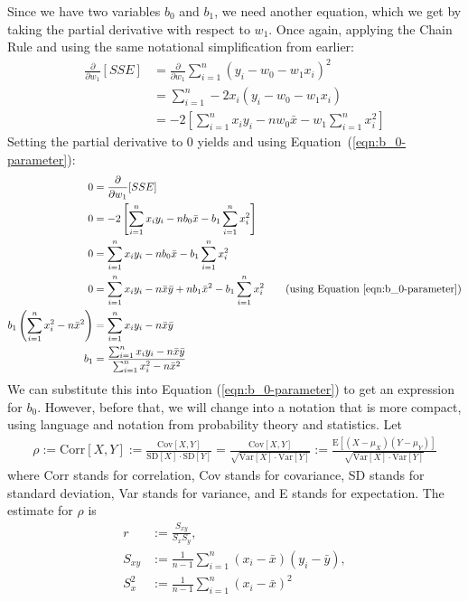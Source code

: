 \documentclass[12pt, a4paper]{article}
\theoremstyle{definition}
\begin{document}
	Since we have two variables $b_0$ and $b_1$, we need another equation, which we get by
	taking the partial derivative with respect to $w_1$. Once again, applying the Chain Rule and
	using the same notational simplification from earlier:
	\begin{align*}
		\frac{\partial}{\partial w_1}[SSE]
		&=\frac{\partial}{\partial w_1}\sum_{i=1}^{n}(y_i-w_0-w_1x_i)^2\\
		&=\sum_{i=1}^{n}-2x_i(y_i-w_0-w_1x_i)\\
		&=-2\left[\sum_{i=1}^{n}x_iy_i-nw_0\bar{x}-w_1\sum_{i=1}^{n}x_i^2\right]
	\end{align*}
	Setting the partial derivative to $0$ yields and using Equation~(\ref{eqn:b_0-parameter}):
	\begin{align}
		0 &= \frac{\partial}{\partial w_1}[SSE]\nonumber\\
		0&=-2\left[\sum_{i=1}^{n}x_iy_i-nb_0\bar{x}-b_1\sum_{i=1}^{n}x_i^2\right]\nonumber\\
		0&=\sum_{i=1}^{n}x_iy_i-nb_0\bar{x}-b_1\sum_{i=1}^{n}x_i^2\nonumber\\
		0&=\sum_{i=1}^{n}x_iy_i-n\bar{x}\bar{y}+nb_1\bar{x}^2-b_1\sum_{i=1}^{n}x_i^2\nonumber
		\tag{using Equation~\ref{eqn:b_0-parameter}}\\
		b_1\left(\sum_{i=1}^{n}x_i^2-n\bar{x}^2\right)&=\sum_{i=1}^{n}x_iy_i-n\bar{x}\bar{y}\nonumber\\
		b_1 &= \frac{\sum_{i=1}^{n}x_iy_i-n\bar{x}\bar{y}}{\sum_{i=1}^{n}x_i^2-n\bar{x}^2}\label{ref:b_1-parameter}
	\end{align}
	We can substitute this into Equation (\ref{eqn:b_0-parameter}) to get an expression
	for $b_0$. However, before that, we will change into a notation that is more compact,
	using language and notation from probability theory and statistics.
	Let
	\begin{align*}
		\rho := \text{Corr}[X, Y]:= \frac{\text{Cov}[X,Y]}{\text{SD}[X]\cdot \text{SD}[Y]}
		=\frac{\text{Cov}[X, Y]}{\sqrt{\text{Var}[X]\cdot \text{Var}[Y]}}
		:=\frac{\text{E}[(X-\mu_X)(Y-\mu_Y)]}{\sqrt{\text{Var}[X]\cdot \text{Var}[Y]}}
	\end{align*}
	where Corr stands for correlation, Cov stands for covariance, SD stands for standard deviation,
	Var stands for variance, and E stands for expectation. The estimate for $\rho$ is
	\begin{align*}
		r &:= \frac{S_{xy}}{S_{x}S_{y}},\\
		S_{xy} &:= \frac{1}{n-1}\sum_{i=1}^{n}(x_i-\bar{x})(y_i-\bar{y}),\\
		S_x^2 &:= \frac{1}{n-1}\sum_{i=1}^{n}(x_i-\bar{x})^2
	\end{align*}
\end{document}
